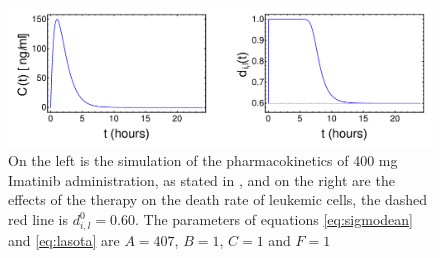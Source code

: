 \documentclass[a4paper,10pt]{article}
\begin{document}
\begin{figure}
\centering
\includegraphics[width=14cm] {farmaco-dy.pdf}
\caption{ On the left is the simulation of the pharmacokinetics of 400 mg Imatinib administration,
as stated in \cite{ishida2016pharmacokinetics}, and on the right are the effects of the therapy on the death rate of leukemic cells,
the dashed red line is $d_{i,l}^0=0.60$. The parameters of equations 
\eqref{eq:sigmodean} and \eqref{eq:lasota} are $A=407$, $B=1$, $C=1$ and $F=1$}
\label{fig:dose} 
\end{figure}


\FloatBarrier
\end{document}
